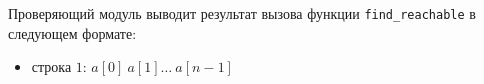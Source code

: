 Проверяющий модуль выводит результат вызова функции \texttt{find\_reachable} в следующем формате:
\begin{itemize}
\item строка $1$: $a[0]\ a[1]\ldots \ a[n-1]$
\end{itemize}
